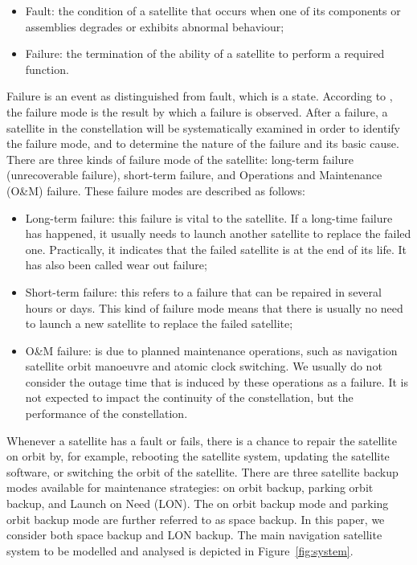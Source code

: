 \documentclass[preprint,12pt]{qrei}
\begin{document}
\begin{itemize}
\item Fault: the condition of a satellite that occurs when one of its components or assemblies degrades or exhibits abnormal behaviour;
\item Failure: the termination of the ability of a satellite to perform a required function.
\end{itemize}

Failure is an event as distinguished from fault, which is a state. According to \cite{Czi13}, the failure mode is the result by which a failure is observed. After a failure, a satellite in the constellation will be systematically examined in order to identify the failure mode, and to determine the nature of the failure and its basic cause. There are three kinds of failure mode of the satellite: long-term failure (unrecoverable failure), short-term failure, and Operations and Maintenance (O\&M) failure. These failure modes are described as follows:

\begin{itemize} 
\item Long-term failure: this failure is vital to the satellite. If a long-time failure has happened, it usually needs to launch another satellite to replace the failed one. Practically, it indicates that the failed satellite is at the end of its life. It has also been called wear out failure;
\item Short-term failure: this refers to a failure that can be repaired in several hours or days. This kind of failure mode means that there is usually no need to launch a new satellite to replace the failed satellite;
\item O\&M failure: is due to planned maintenance operations, such as navigation satellite orbit manoeuvre and atomic clock switching. We usually do not consider the outage time that is induced by these operations as a failure. It is not expected to impact the continuity of the constellation, but the performance of the constellation.
\end{itemize}

Whenever a satellite has a fault or fails, there is a chance to repair the satellite on orbit by, for example, rebooting the satellite system, updating the satellite software, or switching the orbit of the satellite. There are three satellite backup modes available for maintenance strategies: on orbit backup, parking orbit backup, and Launch on Need (LON). The on orbit backup mode and parking orbit backup mode are further referred to as space backup. In this paper, we consider both space backup and LON backup. The main navigation satellite system to be modelled and analysed is depicted in Figure~\ref{fig:system}.
\end{document}
